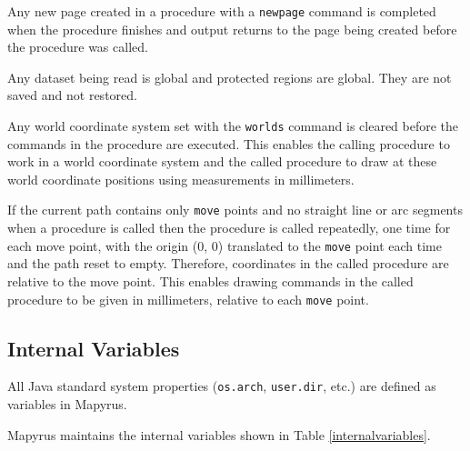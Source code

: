 Any new page created in a procedure with a
\texttt{newpage}
command is completed when the procedure finishes and output
returns to the page being created before the procedure was called.

Any dataset being read is global and protected regions are global.
They are not saved and not restored.

Any world coordinate system set with the \texttt{worlds} command is cleared
before the commands in the procedure are executed.  This enables the calling
procedure to work in a world coordinate system and the called procedure to draw
at these world coordinate positions using measurements in millimeters.

If the current path contains only \texttt{move} points and no straight line or
arc segments when a procedure is called then the procedure is called
repeatedly, one time for each move point, with the origin (0, 0) translated to
the \texttt{move} point each time and the path reset to empty.  Therefore,
coordinates in the called procedure are relative to the move point.  This
enables drawing commands in the called procedure to be given in millimeters,
relative to each \texttt{move} point.

\subsection{Internal Variables}

All Java standard system properties (\texttt{os.arch}, \texttt{user.dir}, etc.)
are defined as variables in Mapyrus.

Mapyrus maintains the internal variables shown in Table \ref{internalvariables}.

